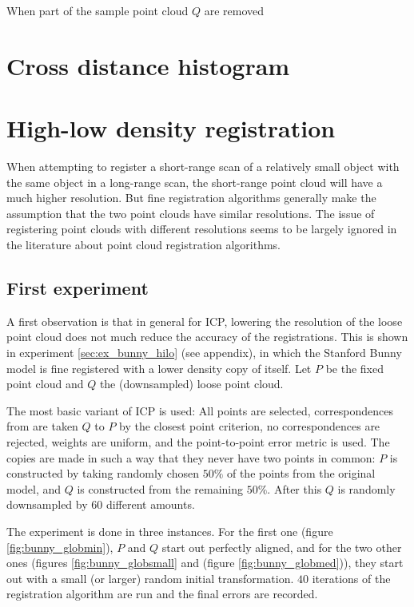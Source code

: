 When part of the sample point cloud $Q$ are removed



\section{Cross distance histogram}


\section{High-low density registration}
When attempting to register a short-range scan of a relatively small object with the same object in a long-range scan, the short-range point cloud will have a much higher resolution. But fine registration algorithms generally make the assumption that the two point clouds have similar resolutions. The issue of registering point clouds with different resolutions seems to be largely ignored in the literature about point cloud registration algorithms.

\subsection{First experiment}
A first observation is that in general for ICP, lowering the resolution of the loose point cloud does not much reduce the accuracy of the registrations. This is shown in experiment \ref{sec:ex_bunny_hilo} (see appendix), in which the Stanford Bunny model is fine registered with a lower density copy of itself. Let $P$ be the fixed point cloud and $Q$ the (downsampled) loose point cloud.

The most basic variant of ICP is used: All points are selected, correspondences from are taken $Q$ to $P$ by the closest point criterion, no correspondences are rejected, weights are uniform, and the point-to-point error metric is used. The copies are made in such a way that they never have two points in common: $P$ is constructed by taking randomly chosen $50\%$ of the points from the original model, and $Q$ is constructed from the remaining $50\%$. After this $Q$ is randomly downsampled by $60$ different amounts.

The experiment is done in three instances. For the first one (figure \ref{fig:bunny_globmin}), $P$ and $Q$ start out perfectly aligned, and for the two other ones (figures \ref{fig:bunny_globsmall} and (figure \ref{fig:bunny_globmed})), they start out with a small (or larger) random initial transformation. $40$ iterations of the registration algorithm are run and the final errors are recorded.

